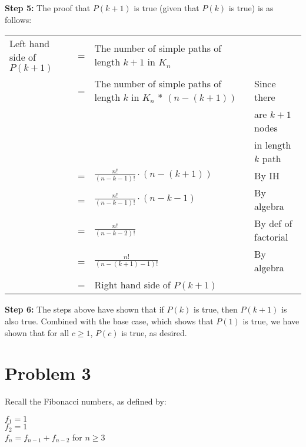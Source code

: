 \documentclass{article}
\begin{document}
\textbf{Step 5:} The proof that $P(k+1)$ is true (given that $P(k)$ is true) is as follows:\vspace{15pt}


\begin{adjustwidth}{-2cm}{}
	\begin{sloppypar}
		\begin{tabular}{l l l l}
			Left hand side of $P(k+1)$ & = & The number of simple paths of length $k+1$ in $K_n$ & \\
									   & = & The number of simple paths of length $k$ in $K_n$ * $(n-(k+1))$ & Since there \\
									   &  & & are $k+1$ nodes \\
									   & & & in length $k$ path \\
									   & = & $\frac{n!}{(n-k-1)!}\cdot (n-(k+1))$ & By IH \\
									   & = & $\frac{n!}{(n-k-1)!}\cdot(n-k-1)$ & By algebra \\
									   & = & $\frac{n!}{(n-k-2)!}$ & By def of factorial \\
									   & = & $\frac{n!}{(n-(k+1)-1)!}$ & By algebra \\
									   & = & Right hand side of $P(k+1)$ & \\
		\end{tabular}
	\end{sloppypar}
\end{adjustwidth}
\vspace{15pt}

\textbf{Step 6:} The steps above have shown that if $P(k)$ is true, then $P(k+1)$ is also true. Combined with the base case, which shows that $P(1)$ is true, we have shown that for all $c\geq 1$, $P(c)$ is true, as desired.



\pagebreak

\section{Problem 3}

Recall the Fibonacci numbers, as defined by:
\begin{center}
    \begin{minipage}{0.5\textwidth} %
        \raggedright %
        $f_1=1$ \\
        $f_2=1$ \\
        $f_n=f_{n-1}+f_{n-2}$ for $n\geq 3$
    \end{minipage}
\end{center}
\vspace{10pt}
\end{document}

